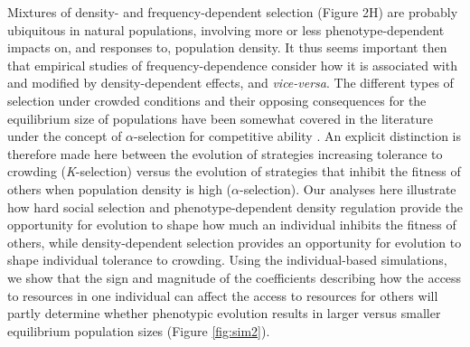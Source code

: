 \documentclass{article}
\begin{document}
Mixtures of density- and frequency-dependent selection (Figure 2H) are probably ubiquitous in natural populations, involving more or less phenotype-dependent impacts on, and responses to, population density. It thus seems important then that empirical studies of frequency-dependence consider how it is associated with and modified by density-dependent effects, and \textit{vice-versa}. The different types of selection under crowded conditions and their opposing consequences for the equilibrium size of populations have been somewhat covered in the literature under the concept of ${\alpha}$-selection for competitive ability \citep{Joshi2001}. An explicit distinction is therefore made here between the evolution of strategies increasing tolerance to crowding (\textit{K}-selection) versus the evolution of strategies that inhibit the fitness of others when population density is high (${\alpha}$-selection). Our analyses here illustrate how hard social selection and phenotype-dependent density regulation provide the opportunity for evolution to shape how much an individual inhibits the fitness of others, while density-dependent selection provides an opportunity for evolution to shape individual tolerance to crowding. Using the individual-based simulations, we show that the sign and magnitude of the coefficients describing how the access to resources in one individual can affect the access to resources for others will partly determine whether phenotypic evolution results in larger versus smaller equilibrium population sizes (Figure \ref{fig:sim2}). 
\end{document}
